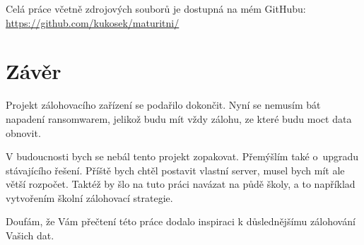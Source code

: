 \documentclass[a4paper,12pt, oneside]{book}
\begin{document}
Celá práce včetně zdrojových souborů je dostupná na mém GitHubu:
\url{https://github.com/kukosek/maturitni/}




\chapter{Závěr}


Projekt zálohovacího zařízení se podařilo dokončit. 
Nyní se nemusím bát napadení
ransomwarem, jelikož budu mít vždy zálohu, ze které budu moct data obnovit.

V budoucnosti bych se nebál tento projekt zopakovat. Přemýšlím také 
o upgradu stávajícího řešení. Příště bych chtěl postavit vlastní server,
musel bych mít ale větší rozpočet. Taktéž by šlo na tuto práci navázat 
na půdě školy, a to například vytvořením školní zálohovací strategie.

 Doufám, že Vám přečtení této práce dodalo inspiraci k
důslednějšímu zálohování Vašich dat.



\nocite{*}
\printbibliography[
	heading=bibintoc,
	title={Seznam zdrojů}
]

\cleardoublepage
\listoffigures
{}
\end{document}
